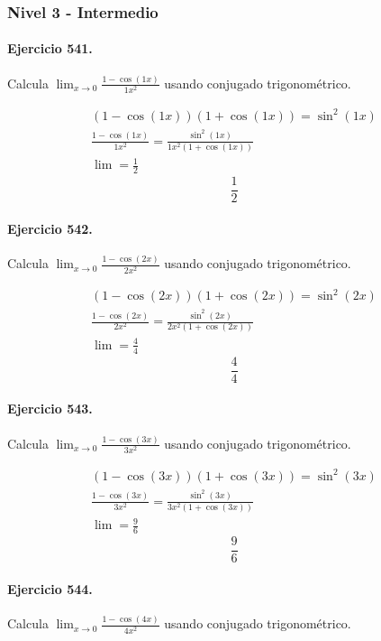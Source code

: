 \documentclass[11pt,a4paper]{article}
\begin{document}
\subsubsection*{Nivel 3 - Intermedio}

\paragraph{Ejercicio 541.} Calcula $\displaystyle\lim_{x\to0}\frac{1-\cos(1x)}{1x^2}$ usando conjugado trigonométrico.

\[
\begin{aligned}
(1-\cos(1x))(1+\cos(1x))=\sin^2(1x)\\
\frac{1-\cos(1x)}{1x^2}=\frac{\sin^2(1x)}{1x^2(1+\cos(1x))}\\
\lim=\frac{1}{2}
\end{aligned}
\]
\[\boxed{\frac{1}{2}}\]


\paragraph{Ejercicio 542.} Calcula $\displaystyle\lim_{x\to0}\frac{1-\cos(2x)}{2x^2}$ usando conjugado trigonométrico.

\[
\begin{aligned}
(1-\cos(2x))(1+\cos(2x))=\sin^2(2x)\\
\frac{1-\cos(2x)}{2x^2}=\frac{\sin^2(2x)}{2x^2(1+\cos(2x))}\\
\lim=\frac{4}{4}
\end{aligned}
\]
\[\boxed{\frac{4}{4}}\]


\paragraph{Ejercicio 543.} Calcula $\displaystyle\lim_{x\to0}\frac{1-\cos(3x)}{3x^2}$ usando conjugado trigonométrico.

\[
\begin{aligned}
(1-\cos(3x))(1+\cos(3x))=\sin^2(3x)\\
\frac{1-\cos(3x)}{3x^2}=\frac{\sin^2(3x)}{3x^2(1+\cos(3x))}\\
\lim=\frac{9}{6}
\end{aligned}
\]
\[\boxed{\frac{9}{6}}\]


\paragraph{Ejercicio 544.} Calcula $\displaystyle\lim_{x\to0}\frac{1-\cos(4x)}{4x^2}$ usando conjugado trigonométrico.
\end{document}
